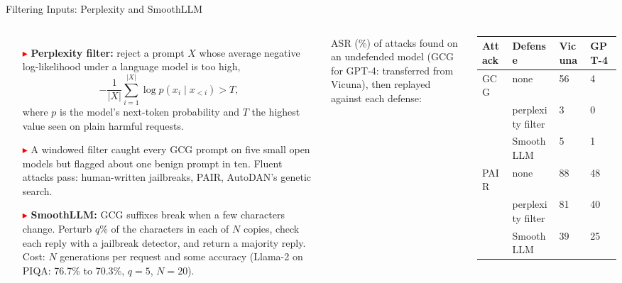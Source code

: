 \begin{frame}{Filtering Inputs: Perplexity and SmoothLLM}
  \begin{columns}[T,onlytextwidth]
      \begin{itemize}\footnotesize\itemsep0.3em
        \item[\textcolor{red}{$\blacktriangleright$}] \textbf{Perplexity filter:} reject a prompt $X$ whose average negative log-likelihood under a language model is too high,
          \[ -\frac{1}{|X|}\sum_{i=1}^{|X|} \log p(x_i \mid x_{<i}) > T, \]
          where $p$ is the model's next-token probability and $T$ the highest value seen on plain harmful requests.
        \item[\textcolor{red}{$\blacktriangleright$}] A windowed filter caught every GCG prompt on five small open models but flagged about one benign prompt in ten. Fluent attacks pass: human-written jailbreaks, PAIR, AutoDAN's genetic search.
        \item[\textcolor{red}{$\blacktriangleright$}] \textbf{SmoothLLM:} GCG suffixes break when a few characters change. Perturb $q\%$ of the characters in each of $N$ copies, check each reply with a jailbreak detector, and return a majority reply. Cost: $N$ generations per request and some accuracy (Llama-2 on PIQA: 76.7\% to 70.3\%, $q = 5$, $N = 20$).
      \end{itemize}
      \centering
      {\scriptsize ASR (\%) of attacks found on an undefended model (GCG for GPT-4: transferred from Vicuna), then replayed against each defense:\par}
      \vspace{0.3em}
      {\scriptsize\setlength{\tabcolsep}{4pt}
      \begin{tabular}{p{0.8cm} p{2.2cm} p{0.9cm} p{0.9cm}}
        \toprule
        \textbf{Attack} & \textbf{Defense} & \textbf{Vicuna} & \textbf{GPT-4} \\
        \midrule
        GCG & none & 56 & 4 \\
            & perplexity filter & 3 & 0 \\
            & SmoothLLM & 5 & 1 \\
        \addlinespace[0.3em]
        PAIR & none & 88 & 48 \\
             & perplexity filter & 81 & 40 \\
             & SmoothLLM & 39 & 25 \\
        \bottomrule
      \end{tabular}\par}

\end{columns}
\end{frame}
